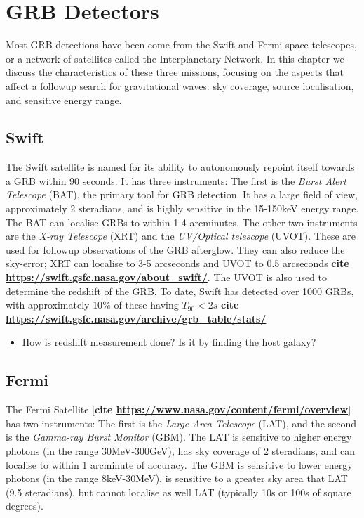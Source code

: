 \documentclass[11pt]{cuthesis}
\begin{document}
\section{GRB Detectors} \label{sec:grb detectors}
Most GRB detections have been come from the Swift and Fermi space telescopes, or a network of satellites called the Interplanetary Network. In this chapter we discuss the characteristics of these three missions, focusing on the aspects that affect a followup search for gravitational waves: sky coverage, source localisation, and sensitive energy range. 

\subsection{Swift}
The Swift satellite is named for its ability to autonomously repoint itself towards a GRB within 90 seconds. It has three instruments: The first is the \textit{Burst Alert Telescope} (BAT), the primary tool for GRB detection. It has a large field of view, approximately 2 steradians, and is highly sensitive in the 15-150keV energy range. The BAT can localise GRBs to within 1-4 arcminutes. The other two instruments are the \textit{X-ray Telescope} (XRT) and the \textit{UV/Optical telescope} (UVOT). These are used for followup observations of the GRB afterglow. They can also reduce the sky-error; XRT can localise to 3-5 arcseconds and UVOT to 0.5 arcseconds \textbf{cite \url{https://swift.gsfc.nasa.gov/about_swift/}}. The UVOT is also used to determine the redshift of the GRB. To date, Swift has detected over 1000 GRBs, with approximately $10\%$ of these having $T_{90}<2s$ \textbf{cite \url{https://swift.gsfc.nasa.gov/archive/grb_table/stats/}}

\begin{itemize}
\item How is redshift measurement done? Is it by finding the host galaxy?
\end{itemize}

\subsection{Fermi}
The Fermi Satellite [\textbf{cite \url{https://www.nasa.gov/content/fermi/overview}}] has two instruments: The first is the \textit{Large Area Telescope} (LAT), and the second is the \textit{Gamma-ray Burst Monitor} (GBM). The LAT is sensitive to higher energy photons (in the range 30MeV-300GeV), has sky coverage of  2 steradians, and can localise to within 1 arcminute of accuracy. The GBM is sensitive to lower energy photons (in the range 8keV-30MeV), is sensitive to a greater sky area that LAT (9.5 steradians), but cannot localise as well LAT (typically 10s or 100s of square degrees). 
\end{document}
